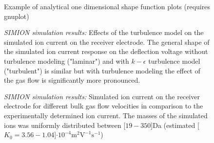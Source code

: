 \documentclass[a4paper,titlepage,DIV11,11pt,BCOR2.5cm,headinclude,english,openany,pdftex]{scrbook}
\newcommand{\mobUnit}{$10^{-4} \mathrm{m}^2 \mathrm{V}^{-1} \mathrm{s}^{-1}$} %
\newcommand{\inMobUnits}[1]{\unit[#1]{$\cdot$\mobUnit}} %
\begin{document}

\begin{figure}[!tb]
   \begin{center}
   
   \caption{Example of analytical one dimensional shape function plots (requires gnuplot)}
   \label{fig:1d-shape-functions}
   \end{center}
\end{figure}

\begin{figure}[!tb]
   \begin{center}
   
   \caption{\emph{SIMION simulation results:} Effects of the turbulence model on the simulated ion current on the receiver electrode. The general shape of the simulated ion current response on the deflection voltage without turbulence modeling ("laminar") and with $k-\epsilon$ turbulence model ("turbulent") is similar but with turbulence modeling the effect of the gas flow is significantly more pronounced.}
   \label{fig:ionMigSim-simion-turbulent-laminar}
   \end{center}
\end{figure}

\begin{figure}[!tb]
   \begin{center}
   
   \caption{\emph{SIMION simulation results:} Simulated ion current on the receiver electrode for different bulk gas flow velocities in comparison to the experimentally determined ion current. The masses of the simulated ions was uniformly distributed between \unit[$19-350$]{Da} (estimated \inMobUnits{$K_0=3.56-1.04 $})}
   \label{fig:ionMigSim-simion-velocity}
   \end{center}
\end{figure}
\end{document}
